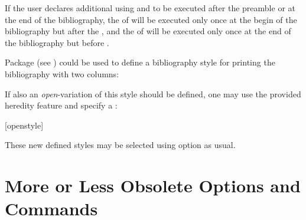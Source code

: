 If the user declares additional  using
 and
to be executed after the preamble or at the end of the bibliography, the
 of  will
be executed only once at the begin of the bibliography but after the
 , and the  of
 will be executed only once at the end
of the bibliography but before .

Package
 (see
\cite{package:multicol}) could be used to define a bibliography style for
printing the bibliography with two columns:
\begin{lstcode}
\end{lstcode}
If also an \emph{open}-variation of this style should be defined, one may use
the provided heredity feature and specify a :
\begin{lstcode}
  [openstyle]{%
    \renewcommand*{\bib@beginhook}{\begin{multicols}{2}}%
    \renewcommand*{\bib@endhook}{\end{multicols}}}%
\end{lstcode}
These new defined styles may be selected using option
 as usual.%
%
\EndIndexGroup


\section{More or Less Obsolete Options and Commands}

%
\EndIndexGroup

\endinput


